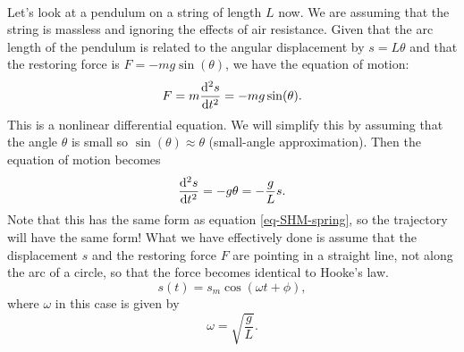 \documentclass[../classical_mechanics.tex]{subfiles}
\begin{document}
        \paragraph{}
        Let's look at a pendulum on a string of length $L$ now.
        We are assuming that the string is massless and ignoring the effects of air resistance.
        Given that the arc length of the pendulum is related to the angular displacement by $s=L\theta$ and that the restoring force is $F=-mg\sin(\theta)$, we have the equation of motion:
        \begin{equation}\label{eq:SHM-pendulum-s-analytic}
            F=m\dv[2]{s}{t}=-mg\sin(\theta).
        \end{equation}
        This is a nonlinear differential equation. We will simplify this by assuming that the angle $\theta$ is small so $\sin(\theta)\approx\theta$ (small-angle approximation).
        Then the equation of motion becomes
        \begin{equation}
            \dv[2]{s}{t}=-g\theta=-\frac{g}{L}s.
        \end{equation}
        Note that this has the same form as equation \ref{eq-SHM-spring}, so the trajectory will have the same form!
        What we have effectively done is assume that the displacement $s$ and the restoring force $F$ are pointing in a straight line, not along the arc of a circle, so that the force becomes identical to Hooke's law.
        \begin{equation}
            s(t)=s_m\cos(\omega t+\phi),
        \end{equation}
        where $\omega$ in this case is given by
        \begin{equation}
            \omega=\sqrt{\frac{g}{L}}.
        \end{equation}
\end{document}
